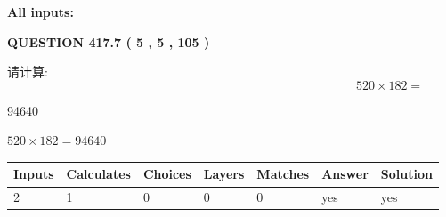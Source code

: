 \documentclass{ctexart}
\begin{document}
   
   
   
\noindent{}
   
   
   
   
\noindent\vspace{0.1in}\hspace{-0.08in} {\textbf{\Large{All inputs: }}}
   
   
  
\vspace{0.2in}
  
{\textbf{\Large{QUESTION
417.7 
 ( 5 , 5 , 105 )
}}}
  
  
 
请计算:
\begin{equation}
520  \times    %
182 = \nonumber
\end{equation}
 
 
 
\noindent{}
 
 

94640
 
 
\noindent{}
 
 

 
 
 
\noindent{}
 
 

$ %
520 \times  %
182=   %
94640$
 
 
\noindent{}
 
 

 
   
   
   
   
\noindent\begin{tabular}{|l|l|l|l|l|l|l|}
 \hline
Inputs & Calculates & Choices & Layers & Matches & Answer & Solution \\ \hline
 2  & 
 1  & 
 0
  & 
 0  & 
 0  & 
  yes & 
  yes 
  \\ \hline
 \end{tabular}
   
   
   
   
\noindent{}
   
\end{document}
